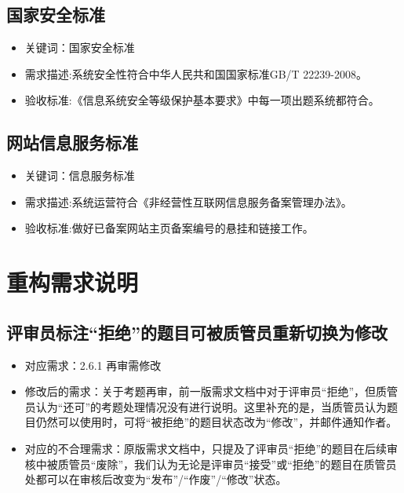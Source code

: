 \documentclass[hyperref, a4paper]{ctexart}
\providecommand{\tightlist}{%
  \setlength{\itemsep}{0pt}\setlength{\parskip}{0pt}}
\begin{document}
\hypertarget{ux56fdux5bb6ux5b89ux5168ux6807ux51c6}{%
\subsection{国家安全标准}\label{ux56fdux5bb6ux5b89ux5168ux6807ux51c6}}

\begin{itemize}
\tightlist
\item
  关键词：国家安全标准
\item
  需求描述:系统安全性符合中华人民共和国国家标准GB/T 22239-2008。
\item
  验收标准:《信息系统安全等级保护基本要求》中每一项出题系统都符合。
\end{itemize}

\hypertarget{ux7f51ux7ad9ux4fe1ux606fux670dux52a1ux6807ux51c6}{%
\subsection{网站信息服务标准}\label{ux7f51ux7ad9ux4fe1ux606fux670dux52a1ux6807ux51c6}}

\begin{itemize}
\tightlist
\item
  关键词：信息服务标准
\item
  需求描述:系统运营符合《非经营性互联网信息服务备案管理办法》。
\item
  验收标准:做好已备案网站主页备案编号的悬挂和链接工作。
\end{itemize}

\hypertarget{ux91cdux6784ux9700ux6c42ux8bf4ux660e}{%
\section{重构需求说明}\label{ux91cdux6784ux9700ux6c42ux8bf4ux660e}}

\hypertarget{ux8bc4ux5ba1ux5458ux6807ux6ce8ux62d2ux7eddux7684ux9898ux76eeux53efux88abux8d28ux7ba1ux5458ux91cdux65b0ux5207ux6362ux4e3aux4feeux6539}{%
\subsection{评审员标注``拒绝''的题目可被质管员重新切换为修改}\label{ux8bc4ux5ba1ux5458ux6807ux6ce8ux62d2ux7eddux7684ux9898ux76eeux53efux88abux8d28ux7ba1ux5458ux91cdux65b0ux5207ux6362ux4e3aux4feeux6539}}

\begin{itemize}
\tightlist
\item
  对应需求：2.6.1 再审需修改
\item
  修改后的需求：关于考题再审，前一版需求文档中对于评审员``拒绝''，但质管员认为``还可''的考题处理情况没有进行说明。这里补充的是，当质管员认为题目仍然可以使用时，可将``被拒绝''的题目状态改为``修改''，并邮件通知作者。
\item
  对应的不合理需求：原版需求文档中，只提及了评审员``拒绝''的题目在后续审核中被质管员``废除''，我们认为无论是评审员``接受''或``拒绝''的题目在质管员处都可以在审核后改变为``发布''/``作废''/``修改''状态。
\end{itemize}
\end{document}
